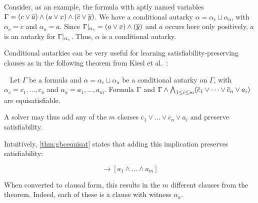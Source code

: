 Consider, as an example, the formula with aptly named variables $\Gamma = (c
\lor \overline{a}) \land (a \lor x) \land (\overline{c} \lor
\overline{y})$. We have a conditional autarky $\alpha = \alpha_c \sqcup
\alpha_a$, with $\alpha_c = c$ and $\alpha_a = a$. Since $\Gamma|_{\alpha_c} =
(a \lor x) \land (\overline{y})$ and $a$ occurs here only positively, $a$
is an autarky for $\Gamma|_{\alpha_c}$. Thus, $\alpha$ is a conditional autarky.


Conditional autarkies can be very useful for learning satisfiability-preserving
clauses as in the
following theorem from Kiesl et al.~\cite{conditionalautarkies}:

\begin{theorem}~\label{thm:gbcequisat} Let $\Gamma$ be a formula and $\alpha =
    \alpha_c \sqcup \alpha_a$ be a conditional autarky on $\Gamma$, with
    $\alpha_c = c_1, \dots, c_n$ and $\alpha_a = a_1, \dots, a_m$. Formula
    $\Gamma$ and $\Gamma \land \bigwedge_{1 \leq i \leq m} (\overline{c}_1
    \lor \dots \lor \overline{c}_n \lor a_i)$ are equisatisfiable.
\end{theorem}


A solver may thus add any of the $m$ clauses
$\overline{c}_1 \lor \dots \lor \overline{c}_n \lor a_i$ and preserve
satisfiability. 

Intuitively, \autoref{thm:gbcequisat} states that adding this implication
preserves satisfiability:

\begin{equation*}
    [c_1 \land \dots \land c_n] \rightarrow [a_1 \land \dots \land a_m]
\end{equation*}

When converted to clausal form, this results in the $m$ different clauses from
the theorem. Indeed, each of these is a \pr clause with witness $\alpha_a$.


